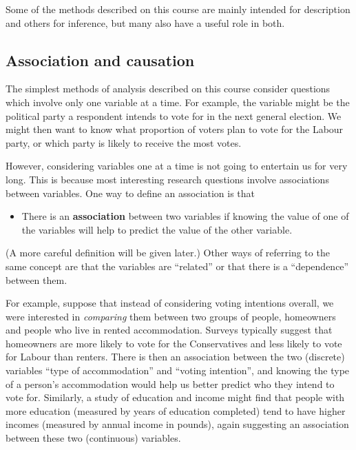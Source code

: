 \documentclass[11pt,a4paper,openany]{book}
\providecommand{\tightlist}{%
  \setlength{\itemsep}{0pt}\setlength{\parskip}{0pt}}
\begin{document}
Some of the methods described on this course are mainly intended for
description and others for inference, but many also have a useful role
in both.

\subsection{Association and causation}\label{ss-intro-def-assoc}

The simplest methods of analysis described on this course consider
questions which involve only one variable at a time. For example, the
variable might be the political party a respondent intends to vote for
in the next general election. We might then want to know what proportion
of voters plan to vote for the Labour party, or which party is likely to
receive the most votes.

However, considering variables one at a time is not going to entertain
us for very long. This is because most interesting research questions
involve associations between variables. One way to define an association
is that

\begin{itemize}
\tightlist
\item
  There is an \textbf{association} between two variables if knowing the
  value of one of the variables will help to predict the value of the
  other variable.
\end{itemize}

(A more careful definition will be given later.) Other ways of referring
to the same concept are that the variables are ``related'' or that there
is a ``dependence'' between them.

For example, suppose that instead of considering voting intentions
overall, we were interested in \emph{comparing} them between two groups
of people, homeowners and people who live in rented accommodation.
Surveys typically suggest that homeowners are more likely to vote for
the Conservatives and less likely to vote for Labour than renters. There
is then an association between the two (discrete) variables ``type of
accommodation'' and ``voting intention'', and knowing the type of a
person's accommodation would help us better predict who they intend to
vote for. Similarly, a study of education and income might find that
people with more education (measured by years of education completed)
tend to have higher incomes (measured by annual income in pounds), again
suggesting an association between these two (continuous) variables.
\end{document}
